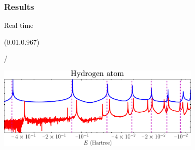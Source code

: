 \documentclass{beamer}
\makeatletter
\newcommand{\framenumber}{
\begin{textblock}{0}(0.01,0.967)
\begin{scriptsize}
{\color{gray}\insertframenumber/\inserttotalframenumber}
\end{scriptsize}
\end{textblock}
}
\makeatother
\begin{document}
\begin{frame}{}
\begin{columns}[t]
    \end{columns}

\end{frame}

\subsubsection{Results}
\begin{frame}{Real time}\framenumber{}
\includegraphics[width=0.75\textwidth]{figures/h_spectrum}\\
\begin{flushright}
\end{flushright}
\end{frame}
\end{document}

